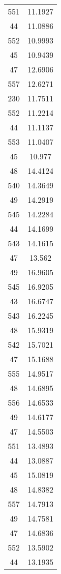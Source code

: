 \begin{tabular}[c]{|c|c|}
       551&   11.1927\\
        44&   11.0886\\
       552&   10.9993\\
        45&   10.9439\\
        47&   12.6906\\
       557&   12.6271\\
       230&   11.7511\\
       552&   11.2214\\
        44&   11.1137\\
       553&   11.0407\\
        45&    10.977\\
        48&   14.4124\\
       540&   14.3649\\
        49&   14.2919\\
       545&   14.2284\\
        44&   14.1699\\
       543&   14.1615\\
        47&    13.562\\
        49&   16.9605\\
       545&   16.9205\\
        43&   16.6747\\
       543&   16.2245\\
        48&   15.9319\\
       542&   15.7021\\
        47&   15.1688\\
       555&   14.9517\\
        48&   14.6895\\
       556&   14.6533\\
        49&   14.6177\\
        47&   14.5503\\
       551&   13.4893\\
        44&   13.0887\\
        45&   15.0819\\
        48&   14.8382\\
       557&   14.7913\\
        49&   14.7581\\
        47&   14.6836\\
       552&   13.5902\\
        44&   13.1935\\

\end{tabular}
